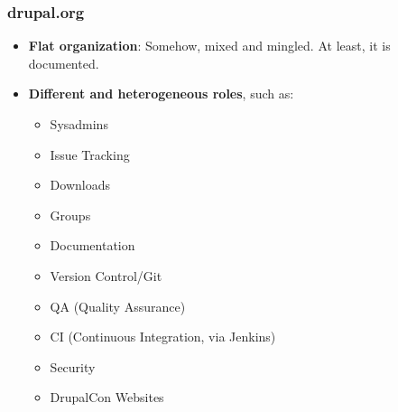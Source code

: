 \begin{frame}[allowframebreaks]
\frametitle{drupal.org}

\begin{itemize}
\item \textbf{Flat organization}: Somehow, mixed and mingled. At least, it is documented.
\item \textbf{Different and heterogeneous roles}, such as:
\begin{itemize}
\item{Sysadmins}
\item{Issue Tracking}
\item{Downloads}
\item{Groups}
\item{Documentation}
\item{Version Control/Git}
\item{QA (Quality Assurance)}
\item{CI (Continuous Integration, via Jenkins)}
\item{Security}
\item{DrupalCon Websites}
\end{itemize}
\end{itemize}
\end{frame}
